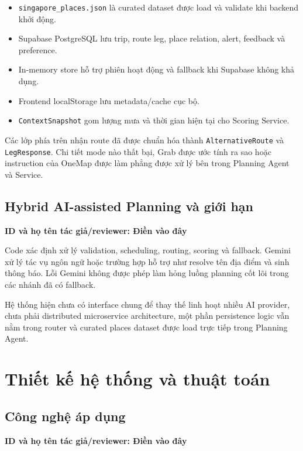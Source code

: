 \documentclass[12pt,a4paper]{article}
\newcommand{\tacgia}{%
  \begin{tcolorbox}[colback=blue!3,colframe=blue!25,boxrule=0.4pt,arc=1mm]
    \small\textbf{ID và họ tên tác giả/reviewer: Điền vào đây}
  \end{tcolorbox}
}
\begin{document}
\begin{itemize}
    \item \texttt{singapore\_places.json} là curated dataset được load và validate khi backend khởi động.
    \item Supabase PostgreSQL lưu trip, route leg, place relation, alert, feedback và preference.
    \item In-memory store hỗ trợ phiên hoạt động và fallback khi Supabase không khả dụng.
    \item Frontend localStorage lưu metadata/cache cục bộ.
    \item \texttt{ContextSnapshot} gom lượng mưa và thời gian hiện tại cho Scoring Service.
\end{itemize}

Các lớp phía trên nhận route đã được chuẩn hóa thành \texttt{AlternativeRoute} và \texttt{LegResponse}. Chi tiết mode nào thất bại, Grab được ước tính ra sao hoặc instruction của OneMap được làm phẳng được xử lý bên trong Planning Agent và Service.

\subsection{Hybrid AI-assisted Planning và giới hạn}
\tacgia

Code xác định xử lý validation, scheduling, routing, scoring và fallback. Gemini xử lý tác vụ ngôn ngữ hoặc trường hợp hỗ trợ như resolve tên địa điểm và sinh thông báo. Lỗi Gemini không được phép làm hỏng luồng planning cốt lõi trong các nhánh đã có fallback.

Hệ thống hiện chưa có interface chung để thay thế linh hoạt nhiều AI provider, chưa phải distributed microservice architecture, một phần persistence logic vẫn nằm trong router và curated places dataset được load trực tiếp trong Planning Agent.

\section{Thiết kế hệ thống và thuật toán}

\subsection{Công nghệ áp dụng}
\tacgia
\end{document}
